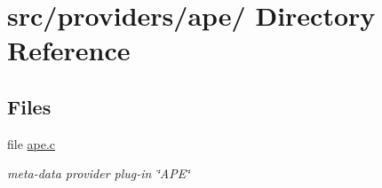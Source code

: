 \hypertarget{dir_000007}{
\section{src/providers/ape/ Directory Reference}
\label{dir_000007}
}
\subsection*{Files}
\begin{CompactItemize}
\item 
file \hyperlink{ape_8c}{ape.c}
\begin{CompactList}\small\item\em meta-data provider plug-in \char`\"{}APE\char`\"{} \item\end{CompactList}

\end{CompactItemize}
